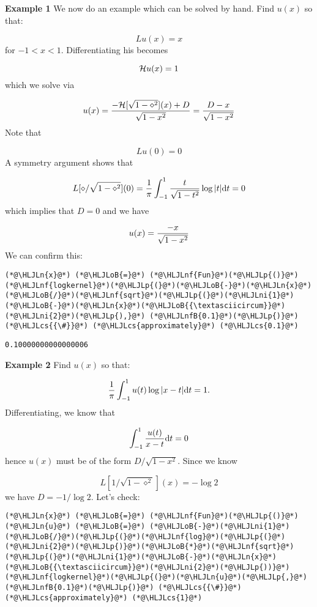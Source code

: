 \documentclass[12pt,a4paper]{article}
\newcommand{\HLJLn}[1]{#1}
\newcommand{\HLJLnf}[1]{\textcolor[RGB]{66,102,213}{#1}}
\newcommand{\HLJLnfB}[1]{\textcolor[RGB]{59,151,46}{#1}}
\newcommand{\HLJLni}[1]{\textcolor[RGB]{59,151,46}{#1}}
\newcommand{\HLJLoB}[1]{\textcolor[RGB]{102,102,102}{\textbf{#1}}}
\newcommand{\HLJLp}[1]{#1}
\newcommand{\HLJLcs}[1]{\textcolor[RGB]{153,153,119}{\textit{#1}}}
\def\D{ {\rm d} }
\def\HH{ {\cal H} }
\def\dt{\D t}
\begin{document}
\textbf{Example 1} We now do an example which can be solved by hand. Find $u(x)$ so that:

\[
L u(x) = x
\]
for $-1 < x < 1$. Differentiating his becomes

\[
\HH u(x) = 1
\]
which we solve via

\[
u(x) = {- \HH[\sqrt{1-\diamond^2}](x) + D \over \sqrt{1-x^2}} = {D-x \over \sqrt{1-x^2}}
\]
Note that

\[
L u(0) = 0
\]
A symmetry argument shows that

\[
L [\diamond/\sqrt{1-\diamond^2}](0) = {1 \over \pi} \int_{-1}^1 {t \over \sqrt{1-t^2}} \log|t| \D t = 0
\]
which implies that $D = 0$ and we have

\[
u(x) = {-x \over \sqrt{1-x^2}}
\]
We can confirm this:


\begin{lstlisting}
(*@\HLJLn{x}@*) (*@\HLJLoB{=}@*) (*@\HLJLnf{Fun}@*)(*@\HLJLp{()}@*)
(*@\HLJLnf{logkernel}@*)(*@\HLJLp{(}@*)(*@\HLJLoB{-}@*)(*@\HLJLn{x}@*)(*@\HLJLoB{/}@*)(*@\HLJLnf{sqrt}@*)(*@\HLJLp{(}@*)(*@\HLJLni{1}@*)(*@\HLJLoB{-}@*)(*@\HLJLn{x}@*)(*@\HLJLoB{{\textasciicircum}}@*)(*@\HLJLni{2}@*)(*@\HLJLp{),}@*) (*@\HLJLnfB{0.1}@*)(*@\HLJLp{)}@*) (*@\HLJLcs{{\#}}@*) (*@\HLJLcs{approximately}@*) (*@\HLJLcs{0.1}@*)
\end{lstlisting}

\begin{lstlisting}
0.10000000000000006
\end{lstlisting}


\textbf{Example 2} Find $u(x)$ so that:

\[
{1 \over \pi} \int_{-1}^1 u(t) \log | x-t| \dt = 1.
\]
Differentiating, we know that

\[
\int_{-1}^1 {u(t) \over x-t} \dt = 0
\]
hence $u(x)$ must be of the form ${D / \sqrt{1-x^2}}$.  Since we know

\[
L[{1 /\sqrt{1-\diamond^2}}](x) = - \log 2
\]
we have $D = -1/\log 2$. Let's check:


\begin{lstlisting}
(*@\HLJLn{x}@*) (*@\HLJLoB{=}@*) (*@\HLJLnf{Fun}@*)(*@\HLJLp{()}@*)
(*@\HLJLn{u}@*) (*@\HLJLoB{=}@*) (*@\HLJLoB{-}@*)(*@\HLJLni{1}@*)(*@\HLJLoB{/}@*)(*@\HLJLp{(}@*)(*@\HLJLnf{log}@*)(*@\HLJLp{(}@*)(*@\HLJLni{2}@*)(*@\HLJLp{)}@*)(*@\HLJLoB{*}@*)(*@\HLJLnf{sqrt}@*)(*@\HLJLp{(}@*)(*@\HLJLni{1}@*)(*@\HLJLoB{-}@*)(*@\HLJLn{x}@*)(*@\HLJLoB{{\textasciicircum}}@*)(*@\HLJLni{2}@*)(*@\HLJLp{))}@*)
(*@\HLJLnf{logkernel}@*)(*@\HLJLp{(}@*)(*@\HLJLn{u}@*)(*@\HLJLp{,}@*) (*@\HLJLnfB{0.1}@*)(*@\HLJLp{)}@*) (*@\HLJLcs{{\#}}@*) (*@\HLJLcs{approximately}@*) (*@\HLJLcs{1}@*)
\end{lstlisting}
\end{document}
